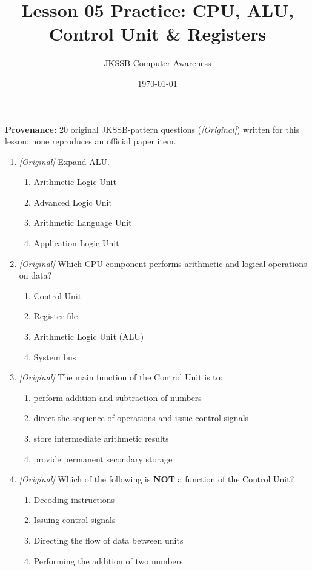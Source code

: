 \documentclass[11pt]{article}
\title{Lesson 05 Practice: CPU, ALU, Control Unit \& Registers}
\author{JKSSB Computer Awareness}
\date{\today}
\begin{document}
\maketitle
\noindent\textbf{Provenance:} 20 original JKSSB-pattern questions
(\textit{[Original]}) written for this lesson; none reproduces an official
paper item.

\begin{enumerate}[label=\textbf{Q\arabic*.}, leftmargin=*]
\item \textit{[Original]} Expand ALU.
  \begin{enumerate}[label=\Alph*.]
    \item Arithmetic Logic Unit
    \item Advanced Logic Unit
    \item Arithmetic Language Unit
    \item Application Logic Unit
  \end{enumerate}
\item \textit{[Original]} Which CPU component performs arithmetic and
  logical operations on data?
  \begin{enumerate}[label=\Alph*.]
    \item Control Unit
    \item Register file
    \item Arithmetic Logic Unit (ALU)
    \item System bus
  \end{enumerate}
\item \textit{[Original]} The main function of the Control Unit is to:
  \begin{enumerate}[label=\Alph*.]
    \item perform addition and subtraction of numbers
    \item direct the sequence of operations and issue control signals
    \item store intermediate arithmetic results
    \item provide permanent secondary storage
  \end{enumerate}
\item \textit{[Original]} Which of the following is \textbf{NOT} a function
  of the Control Unit?
  \begin{enumerate}[label=\Alph*.]
    \item Decoding instructions
    \item Issuing control signals
    \item Directing the flow of data between units
    \item Performing the addition of two numbers

\end{enumerate}
\end{enumerate}
\end{document}
